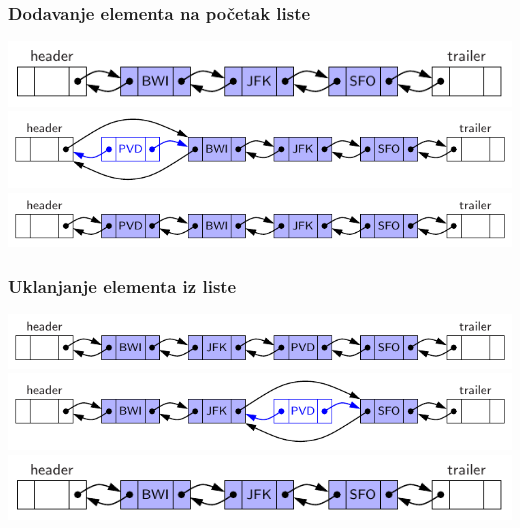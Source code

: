 \documentclass[compress]{beamer}
\begin{document}
\begin{frame}[fragile]
  \frametitle{Dodavanje elementa na početak liste}
  \begin{center}
    \includegraphics[scale=0.9]{asp-07-pic09a.pdf} \\
    \includegraphics[scale=0.9]{asp-07-pic09b.pdf} \\
    \includegraphics[scale=0.9]{asp-07-pic09c.pdf}
  \end{center}
\end{frame}

\begin{frame}[fragile]
  \frametitle{Uklanjanje elementa iz liste}
  \begin{center}
    \includegraphics[scale=0.9]{asp-07-pic10a.pdf} \\
    \includegraphics[scale=0.9]{asp-07-pic10b.pdf} \\
    \includegraphics[scale=0.9]{asp-07-pic10c.pdf}
  \end{center}
\end{frame}
\end{document}
